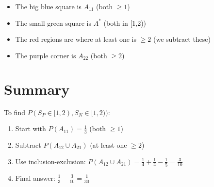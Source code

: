 \documentclass[11pt]{article}
\begin{document}
\begin{itemize}
    \item The big blue square is $A_{11}$ (both $\geq 1$)
    \item The small green square is $A^*$ (both in [1,2))
    \item The red regions are where at least one is $\geq 2$ (we subtract these)
    \item The purple corner is $A_{22}$ (both $\geq 2$)
\end{itemize}

\section*{Summary}

To find $P(S_P \in [1,2), S_N \in [1,2))$:

\begin{enumerate}
    \item Start with $P(A_{11}) = \frac{1}{3}$ (both $\geq 1$)
    \item Subtract $P(A_{12} \cup A_{21})$ (at least one $\geq 2$)
    \item Use inclusion-exclusion: $P(A_{12} \cup A_{21}) = \frac{1}{4} + \frac{1}{4} - \frac{1}{5} = \frac{3}{10}$
    \item Final answer: $\frac{1}{3} - \frac{3}{10} = \frac{1}{30}$
\end{enumerate}
\end{document}
